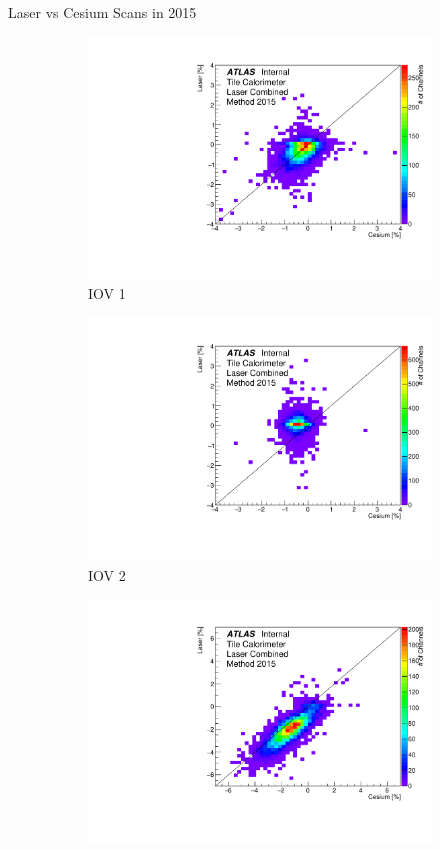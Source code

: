 \documentclass{beamer}
\begin{document}
\begin{frame}{Laser vs Cesium Scans in 2015}
    \begin{figure}[H]
\centering
\begin{subfigure} [t] {0.3\textwidth}
\includegraphics[width=\textwidth]{colz_iov1.pdf}
\caption{IOV 1}
\end{subfigure}
\begin{subfigure} [t] {0.3\textwidth}
\includegraphics[width=\textwidth]{colz_iov2.pdf}
\caption{IOV 2}
\end{subfigure}
\begin{subfigure} [t] {0.3\textwidth}
\includegraphics[width=\textwidth]{colz_iov3.pdf}

\end{subfigure}
\end{figure}
\end{frame}
\end{document}
